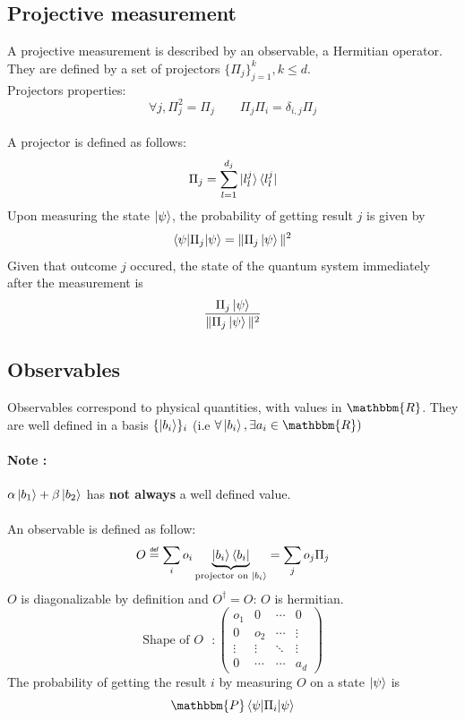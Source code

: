 \documentclass{article}
\newcommand\eqdef{\mathrel{\overset{\makebox[0pt]{\mbox{\normalfont\tiny\sffamily
def}}}{=}}}
\begin{document}
\subsection{Projective measurement}
A projective measurement is described by an observable, a Hermitian operator.
They are defined by a set of projectors $\{\Pi_j\}_{j=1}^k, k \leq d$.\\
Projectors properties:
\begin{equation}
    \forall j, \Pi_j^2 = \Pi_j \qquad \Pi_j\Pi_i = \delta_{i,j}\Pi_j
\end{equation}
\\\noindent A projector is defined as follows:
\begin{equation}
    \Pi_j = \sum_{l=1}^{d_j}\ket{l_l^j}\bra{l_l^j}
\end{equation}
Upon measuring the state $\ket{\psi}$, the probability of getting result $j$ is
given by
\begin{equation}
    \braket{\psi|\Pi_j|\psi} = \| \Pi_j\ket{\psi}\|^2
\end{equation}
Given that outcome $j$ occured, the state of the quantum system immediately
after the measurement is
\begin{equation}
    \frac{\Pi_j\ket{\psi}}{\| \Pi_j\ket{\psi}\|^2}
\end{equation}

\subsection{Observables}
Observables correspond to physical quantities, with values in $\mathbbm{R}$.
They are well defined in a basis $\{\ket{b_i}\}_i$ (i.e $\forall \ket{b_i},
\exists a_i \in \mathbbm{R})$

\paragraph{Note :} $\alpha\ket{b_1} + \beta\ket{b_2}$ has \textbf{not always} a
well defined value. \\
\\
An observable is defined as follow:
\begin{equation}
    O \eqdef \sum_i o_i \underbrace{\ket{b_i}\bra{b_i}}_{\text{projector on $\ket{b_i}$}}
    = \sum_j o_j \Pi_j
\end{equation}
$O$ is diagonalizable by definition and $O^\dagger = O$: $O$ is hermitian.
\begin{equation}
\text{Shape of $O$ } :
\begin{pmatrix}
    o_1 & 0 & \cdots & 0 \\
    0 & o_2 & \cdots & \vdots \\
    \vdots  & \vdots  & \ddots & \vdots  \\
    0 & \cdots & \cdots & a_d
\end{pmatrix}
\end{equation}
The probability of getting the result $i$ by measuring $O$ on a state
$\ket{\psi}$ is
\begin{equation}
\mathbbm{P}\braket{\psi|\Pi_i|\psi}
\end{equation}
\end{document}

